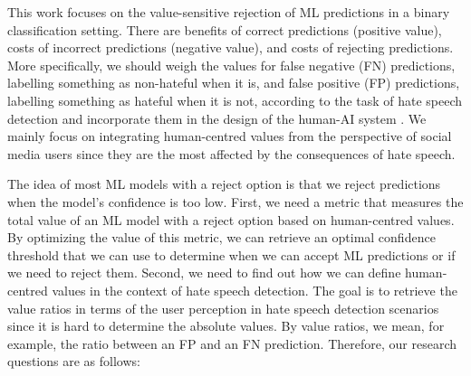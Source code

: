 %
This work focuses on the value-sensitive rejection of ML predictions in a binary classification setting.
%
There are benefits of correct predictions (positive value), costs of incorrect predictions (negative value), and costs of rejecting predictions.
%
More specifically, we should weigh the values for false negative (FN) predictions, labelling something as non-hateful when it is, and false positive (FP) predictions, labelling something as hateful when it is not, according to the task of hate speech detection and incorporate them in the design of the human-AI system \citep{sayin2021science}.
%
We mainly focus on integrating human-centred values from the perspective of social media users since they are the most affected by the consequences of hate speech.
%

%
The idea of most ML models with a reject option is that we reject predictions when the model's confidence is too low.
%
First, we need a metric that measures the total value of an ML model with a reject option based on human-centred values.
%
By optimizing the value of this metric, we can retrieve an optimal confidence threshold that we can use to determine when we can accept ML predictions or if we need to reject them.
%
Second, we need to find out how we can define human-centred values in the context of hate speech detection.
%
The goal is to retrieve the value ratios in terms of the user perception in hate speech detection scenarios since it is hard to determine the absolute values.
%
By value ratios, we mean, for example, the ratio between an FP and an FN prediction.
%
Therefore, our research questions are as follows:
%



\noindent{}\newline

